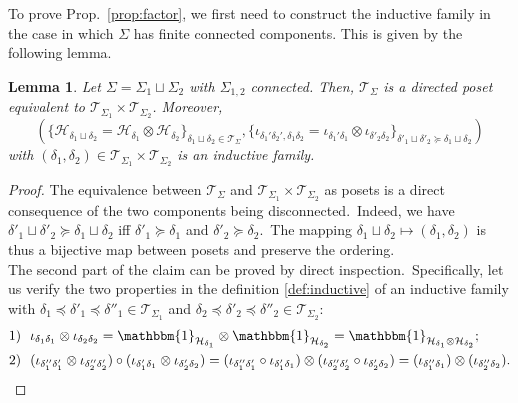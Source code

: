 \documentclass[11pt]{article}
\newcommand{\h}{\mathcal{H}}
\newtheorem{lemma}[proposition]{Lemma}
\theoremstyle{definition}
\numberwithin{equation}{section}
\begin{document}
\noindent To prove Prop.~\ref{prop:factor}, we first need to construct the inductive family in the case in which $\Sigma$ has finite connected components. This is given by the following lemma.
\begin{lemma}
\label{connIndF}
    Let $\Sigma=\Sigma_1\sqcup\Sigma_2$ with $\Sigma_{1,2}$ connected. Then, $\mathcal{T}_{\Sigma}$ is a directed poset equivalent to $\mathcal{T}_{\Sigma_1}\times\mathcal{T}_{\Sigma_2}$. Moreover, \[(\{\h_{\delta_1\sqcup\delta_2}=\h_{\delta_1}\otimes\h_{\delta_2}\}_{\delta_1\sqcup\delta_2\in \mathcal{T}_{\Sigma}},\{\iota_{\delta_1'\delta_2',\delta_1\delta_2}=\iota_{\delta_1'\delta_1}\otimes\iota_{\delta'_2\delta_2}\}_{\delta'_1\sqcup\delta'_2\succeq\delta_1\sqcup\delta_2})\] with $(\delta_1,\delta_2)\in\mathcal{T}_{\Sigma_1}\times\mathcal{T}_{\Sigma_2}$ is an inductive family.
\end{lemma}
\begin{proof}
    The equivalence between $\mathcal T_{\Sigma}$ and $\mathcal{T}_{\Sigma_1}\times\mathcal{T}_{\Sigma_2}$ as posets is a direct consequence of the two components being disconnected.~Indeed, we have $\delta'_1\sqcup\delta'_2\succeq\delta_1\sqcup\delta_2$ iff $\delta'_1\succeq\delta_1$ and $\delta'_2\succeq\delta_2$.~The mapping $\delta_1\sqcup\delta_2\mapsto (\delta_1,\delta_2)$ is thus a bijective map between posets and preserve the ordering.\\
    The second part of the claim can be proved by direct inspection.~Specifically, let us verify the two properties in the definition \eqref{def:inductive} of an inductive family with $\delta_1\preceq\delta'_1\preceq\delta''_1\in\mathcal{T}_{\Sigma_1}$ and $\delta_2\preceq\delta'_2\preceq\delta''_2\in\mathcal{T}_{\Sigma_2}$:
    \begin{align*}
        &1)\ \ \iota_{\delta_1\delta_1}\otimes\iota_{\delta_2\delta_2}=\mathbbm{1}_{\h_{\delta_1}}\otimes\mathbbm{1}_{\h_{\delta_2}}=\mathbbm{1}_{\h_{\delta_1}\otimes\h_{\delta_2}};\\
        &2)\ \ (\iota_{\delta''_1\delta'_1}\otimes\iota_{\delta''_2\delta'_2})\circ(\iota_{\delta'_1\delta_1}\otimes\iota_{\delta'_2\delta_2})=(\iota_{\delta''_1\delta'_1}\circ\iota_{\delta'_1\delta_1})\otimes(\iota_{\delta''_2\delta'_2}\circ\iota_{\delta'_2\delta_2})=(\iota_{\delta''_1\delta_1})\otimes(\iota_{\delta''_2\delta_2}).
    \end{align*}
\end{proof}
\end{document}
